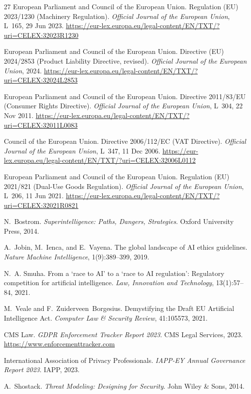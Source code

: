 \documentclass[11pt,a4paper]{article}
\begin{document}
\begin{thebibliography}{27}
European Parliament and Council of the European Union.
\newblock Regulation (EU) 2023/1230 (Machinery Regulation).
\newblock \emph{Official Journal of the European Union}, L~165, 29 Jun 2023.
\newblock \url{https://eur-lex.europa.eu/legal-content/EN/TXT/?uri=CELEX:32023R1230}

European Parliament and Council of the European Union.
\newblock Directive (EU) 2024/2853 (Product Liability Directive, revised).
\newblock \emph{Official Journal of the European Union}, 2024.
\newblock \url{https://eur-lex.europa.eu/legal-content/EN/TXT/?uri=CELEX:32024L2853}

European Parliament and Council of the European Union.
\newblock Directive 2011/83/EU (Consumer Rights Directive).
\newblock \emph{Official Journal of the European Union}, L~304, 22 Nov 2011.
\newblock \url{https://eur-lex.europa.eu/legal-content/EN/TXT/?uri=CELEX:32011L0083}

Council of the European Union.
\newblock Directive 2006/112/EC (VAT Directive).
\newblock \emph{Official Journal of the European Union}, L~347, 11 Dec 2006.
\newblock \url{https://eur-lex.europa.eu/legal-content/EN/TXT/?uri=CELEX:32006L0112}

European Parliament and Council of the European Union.
\newblock Regulation (EU) 2021/821 (Dual-Use Goods Regulation).
\newblock \emph{Official Journal of the European Union}, L~206, 11 Jun 2021.
\newblock \url{https://eur-lex.europa.eu/legal-content/EN/TXT/?uri=CELEX:32021R0821}

N.~Bostrom.
\newblock \emph{Superintelligence: Paths, Dangers, Strategies}.
\newblock Oxford University Press, 2014.

A.~Jobin, M.~Ienca, and E.~Vayena.
\newblock The global landscape of {AI} ethics guidelines.
\newblock \emph{Nature Machine Intelligence}, 1(9):389--399, 2019.

N.~A. Smuha.
\newblock From a `race to {AI}' to a `race to {AI} regulation': Regulatory competition for artificial intelligence.
\newblock \emph{Law, Innovation and Technology}, 13(1):57--84, 2021.

M.~Veale and F.~Zuiderveen~Borgesius.
\newblock Demystifying the Draft {EU} Artificial Intelligence Act.
\newblock \emph{Computer Law \& Security Review}, 41:105573, 2021.

CMS Law.
\newblock \emph{GDPR Enforcement Tracker Report 2023}.
\newblock CMS Legal Services, 2023.
\newblock \url{https://www.enforcementtracker.com}

International Association of Privacy Professionals.
\newblock \emph{IAPP-EY Annual Governance Report 2023}.
\newblock IAPP, 2023.

A.~Shostack.
\newblock \emph{Threat Modeling: Designing for Security}.
\newblock John Wiley \& Sons, 2014.

\end{thebibliography}
\end{document}
